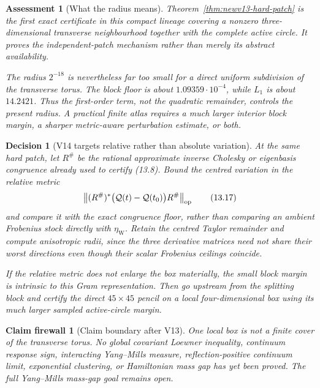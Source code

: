 \documentclass[11pt,oneside]{article}
\newtheorem{assessment}[theorem]{Assessment}
\newtheorem{firewall}[theorem]{Claim firewall}
\newtheorem{decision}[theorem]{Decision}
\theoremstyle{definition}
\theoremstyle{remark}
\begin{document}
\begin{assessment}[What the radius means]
\label{ass:newv13-radius}
Theorem~\ref{thm:newv13-hard-patch} is the first exact certificate in
this compact lineage covering a nonzero three-dimensional transverse
neighbourhood together with the complete active circle.  It proves
the independent-patch mechanism rather than merely its abstract
availability.

The radius \(2^{-18}\) is nevertheless far too small for a direct
uniform subdivision of the transverse torus.  The block floor is
about \(1.09359\cdot10^{-4}\), while \(L_1\) is about \(14.2421\).
Thus the first-order term, not the quadratic remainder, controls the
present radius.  A practical finite atlas requires a much larger
interior block margin, a sharper metric-aware perturbation estimate,
or both.
\end{assessment}

\begin{decision}[V14 targets relative rather than absolute variation]
\label{dec:newv13-next}
At the same hard patch, let \(R^\#\) be the rational approximate
inverse Cholesky or eigenbasis congruence already used to certify
(13.8).  Bound the centred variation in the relative metric
\[
 \left\|(R^\#)^*
   \bigl({\cal Q}(t)-{\cal Q}(t_0)\bigr)R^\#
 \right\|_{\mathrm{op}}                                  \tag{13.17}
\]
and compare it with the exact congruence floor, rather than comparing
an ambient Frobenius stock directly with \(\eta_{\mathrm W}\).
Retain the centred Taylor remainder and compute anisotropic radii,
since the three derivative matrices need not share their worst
directions even though their scalar Frobenius ceilings coincide.

If the relative metric does not enlarge the box materially, the
small block margin is intrinsic to this Gram representation.  Then
go upstream from the splitting block and certify the direct
\(45\times45\) pencil on a local four-dimensional box using its much
larger sampled active-circle margin.
\end{decision}

\begin{firewall}[Claim boundary after V13]
\label{fire:newv13-final}
One local box is not a finite cover of the transverse torus.  No
global covariant Loewner inequality, continuum response sign,
interacting Yang--Mills measure, reflection-positive continuum
limit, exponential clustering, or Hamiltonian mass gap has yet been
proved.  The full Yang--Mills mass-gap goal remains open.
\end{firewall}
\end{document}

